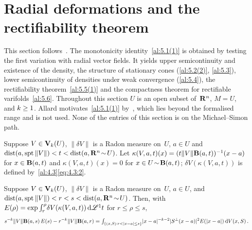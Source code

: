 \section{Radial deformations and the rectifiability theorem}
\label{sec:rectifiability}

\begin{miniremark}
    \label{mr:sec5}
    This section follows~\cite[section~5]{Allard1972}. The monotonicity identity~\ref{al:5.1(1)}
    is obtained by testing the first variation with radial vector fields. It yields upper
    semicontinuity and existence of the density, the structure of stationary cones
    (\ref{al:5.2(2)}, \ref{al:5.3}), lower semicontinuity of densities under weak convergence
    (\ref{al:5.4}), the rectifiability theorem~\ref{al:5.5(1)} and the compactness theorem for
    rectifiable varifolds~\ref{al:5.6}. Throughout this section $U$ is an open subset
    of~$\mathbf{R}^{n}$, $M = U$, and $k \ge 1$. Allard motivates~\ref{al:5.1(1)}
    by~\cite[5.4.3]{Federer1969}, which lies beyond the formalised range and is not used. None of
    the entries of this section is on the Michael--Simon path.
\end{miniremark}

\begin{definition}
    \label{al:5.1}
    Suppose $V \in \mathbf{V}_{k}(U)$, $\|\delta V\|$ is a Radon measure on~$U$, $a \in U$ and
    $\operatorname{dist}(a, \operatorname{spt} \|V\|) < t < \operatorname{dist}(a, \mathbf{R}^{n} \!\sim\! U)$. Let $\kappa(V,a,t)(x) = (t
    \|V\| \mathbf{B}(a,t))^{-1} (x - a)$ for $x \in \mathbf{B}(a,t)$ and $\kappa(V,a,t)(x) = 0$ for $x \in
    U \!\sim\! \mathbf{B}(a,t)$; $\delta V(\kappa(V,a,t))$ is defined by~\ref{al:4.3}\eqref{eq:4.3:2}.
\end{definition}

\begin{theorem}
    \label{al:5.1(1)}
    Suppose $V \in \mathbf{V}_{k}(U)$, $\|\delta V\|$ is a Radon measure on~$U$, $a \in U$, and
    $\operatorname{dist}(a, \operatorname{spt} \|V\|) < r < s < \operatorname{dist}(a, \mathbf{R}^{n} \!\sim\! U)$. Then, with $E(\rho) =
    \exp {\textstyle\int_{r}^{\rho}} \delta V(\kappa(V,a,t)) \,\mathrm{d} \mathscr{L}^1 t$ for $r \le \rho \le s$,
    \begin{displaymath}
        s^{-k} \|V\| \mathbf{B}(a,s) \, E(s) - r^{-k} \|V\| \mathbf{B}(a,r) =
        {\textstyle\int_{\{ (x,S) : r < |x-a| \le s \}}^{}} |x-a|^{-k-2} |S^\perp(x-a)|^2 E(|x-a|) \,\mathrm{d}
        V(x,S) \,.
    \end{displaymath}
\end{theorem}

